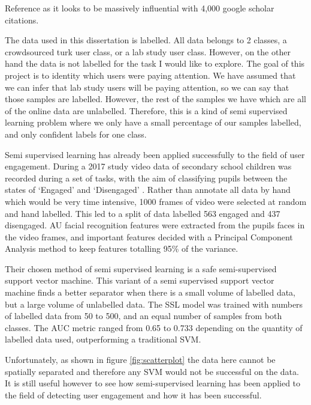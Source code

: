 \documentclass{article}
\begin{document}
Reference \cite{zhu2005semi} as it looks to be massively influential with 4,000 google scholar citations.


The data used in this dissertation is labelled.
All data belongs to 2 classes, a crowdsourced turk user class, or a lab study user class.
However, on the other hand the data is not labelled for the task I would like to explore.
The goal of this project is to identity which users were paying attention.
We have assumed that we can infer that lab study users will be paying attention, so we can say that those samples are labelled.
However, the rest of the samples we have which are all of the online data are unlabelled.
Therefore, this is a kind of semi supervised learning problem where we only have a small percentage of our samples labelled, and only confident labels for one class.

Semi supervised learning has already been applied successfully to the field of user engagement.
During a 2017 study video data of secondary school children was recorded during a set of tasks, with the aim of classifying pupils between the states of `Engaged' and `Disengaged' \cite{nezami2017semi}.
Rather than annotate all data by hand which would be very time intensive, 1000 frames of video were selected at random and hand labelled.
This led to a split of data labelled 563 engaged and 437 disengaged.
AU facial recognition features were extracted from the pupils faces in the video frames, and important features decided with a Principal Component Analysis method to keep features totalling 95\% of the variance.

Their chosen method of semi supervised learning is a safe semi-supervised support vector machine.
This variant of a semi supervised support vector machine finds a better separator when there is a small volume of labelled data, but a large volume of unlabelled data.
The SSL model was trained with numbers of labelled data from 50 to 500, and an equal number of samples from both classes.
The AUC metric ranged from 0.65 to 0.733 depending on the quantity of labelled data used, outperforming a traditional SVM.

Unfortunately, as shown in figure \ref{fig:scatterplot} the data here cannot be spatially separated and therefore any SVM would not be successful on the data. 
It is still useful however to see how semi-supervised learning has been applied to the field of detecting user engagement and how it has been successful.
\end{document}

